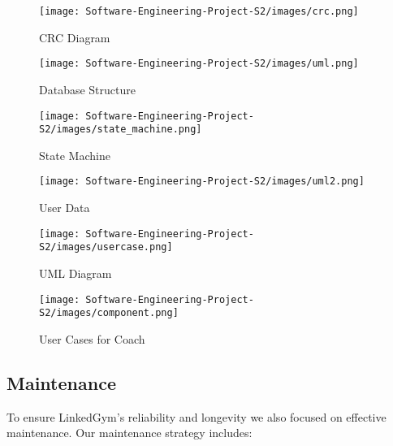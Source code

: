 \begin{figure}[H]
    \centering
    \texttt{[image: Software-Engineering-Project-S2/images/crc.png]}
    \caption{CRC Diagram}
    \label{fig:example_icrcmage}
  \end{figure}


\begin{figure}[H]
    \centering
    \texttt{[image: Software-Engineering-Project-S2/images/uml.png]}
    \caption{Database Structure}
    \label{fig:uml}
  \end{figure}

\begin{figure}[H]
    \centering
    \texttt{[image: Software-Engineering-Project-S2/images/state\_machine.png]}
    
    \caption{State Machine}
    \label{fig:state_machine}
  \end{figure}

 \begin{figure}[H]
    \centering
    \texttt{[image: Software-Engineering-Project-S2/images/uml2.png]}
    \caption{ User Data }
    \label{fig:uml2}
  \end{figure}

   \begin{figure}[H]
    \centering
    \texttt{[image: Software-Engineering-Project-S2/images/usercase.png]}
    \caption{ UML Diagram }
    \label{fig:usercase}
  \end{figure}

  \begin{figure}[H]
    \centering
    \texttt{[image: Software-Engineering-Project-S2/images/component.png]}
    \caption{ User Cases for Coach }
    \label{fig:component}
  \end{figure}



\subsection{Maintenance}
To ensure LinkedGym's reliability and longevity we also focused on effective maintenance. Our maintenance strategy includes:

